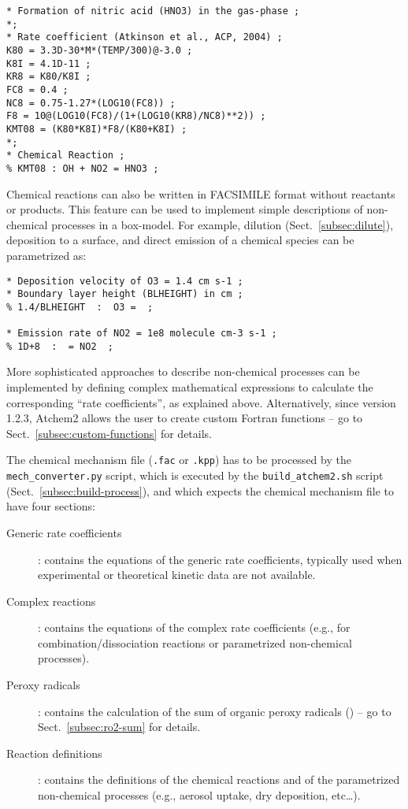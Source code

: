 \begin{verbatim}
* Formation of nitric acid (HNO3) in the gas-phase ;
*;
* Rate coefficient (Atkinson et al., ACP, 2004) ;
K80 = 3.3D-30*M*(TEMP/300)@-3.0 ;
K8I = 4.1D-11 ;
KR8 = K80/K8I ;
FC8 = 0.4 ;
NC8 = 0.75-1.27*(LOG10(FC8)) ;
F8 = 10@(LOG10(FC8)/(1+(LOG10(KR8)/NC8)**2)) ;
KMT08 = (K80*K8I)*F8/(K80+K8I) ;
*;
* Chemical Reaction ;
% KMT08 : OH + NO2 = HNO3 ;
\end{verbatim}

Chemical reactions can also be written in FACSIMILE format without
reactants or products. This feature can be used to implement simple
descriptions of non-chemical processes in a box-model. For example,
dilution (Sect.~\ref{subsec:dilute}), deposition to a surface, and
direct emission of a chemical species can be parametrized as:

\begin{verbatim}
* Deposition velocity of O3 = 1.4 cm s-1 ;
* Boundary layer height (BLHEIGHT) in cm ;
% 1.4/BLHEIGHT  :  O3 =  ;

* Emission rate of NO2 = 1e8 molecule cm-3 s-1 ;
% 1D+8  :  = NO2  ;
\end{verbatim}

More sophisticated approaches to describe non-chemical processes can
be implemented by defining complex mathematical expressions to
calculate the corresponding ``rate coefficients'', as explained
above. Alternatively, since version 1.2.3, Atchem2 allows the user to
create custom Fortran functions -- go to Sect.~\ref{subsec:custom-functions}
for details.

The chemical mechanism file (\texttt{.fac} or \texttt{.kpp}) has to be
processed by the \texttt{mech\_converter.py} script, which is executed
by the \texttt{build\_atchem2.sh} script (Sect.~\ref{subsec:build-process}),
and which expects the chemical mechanism file to have four sections:

\begin{description}
\item[Generic rate coefficients]: contains the equations of the
  generic rate coefficients, typically used when experimental or
  theoretical kinetic data are not available.
\item[Complex reactions]: contains the equations of the complex rate
  coefficients (e.g., for combination/dissociation reactions or
  parametrized non-chemical processes).
\item[Peroxy radicals]: contains the calculation of the sum of organic
  peroxy radicals () -- go to Sect.~\ref{subsec:ro2-sum} for
  details.
\item[Reaction definitions]: contains the definitions of the chemical
  reactions and of the parametrized non-chemical processes (e.g.,
  aerosol uptake, dry deposition, etc\ldots).
\end{description}

